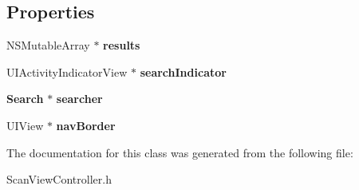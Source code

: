 \subsection*{Properties}
\begin{DoxyCompactItemize}
\item 
N\+S\+Mutable\+Array $\ast$ {\bfseries results}\label{interface_scan_view_controller_a13f6278d7cba6cb1638f35ffc97aa10c}

\item 
U\+I\+Activity\+Indicator\+View $\ast$ {\bfseries search\+Indicator}\label{interface_scan_view_controller_ada67b8724fa93138bd3839cfa6c8218a}

\item 
{\bf Search} $\ast$ {\bfseries searcher}\label{interface_scan_view_controller_afb27be43e63ee6a97de8e10b264ca9ad}

\item 
U\+I\+View $\ast$ {\bfseries nav\+Border}\label{interface_scan_view_controller_a102ccac39ddb684dc481cca8d6be7526}

\end{DoxyCompactItemize}


The documentation for this class was generated from the following file\+:\begin{DoxyCompactItemize}
\item 
Scan\+View\+Controller.\+h\end{DoxyCompactItemize}

